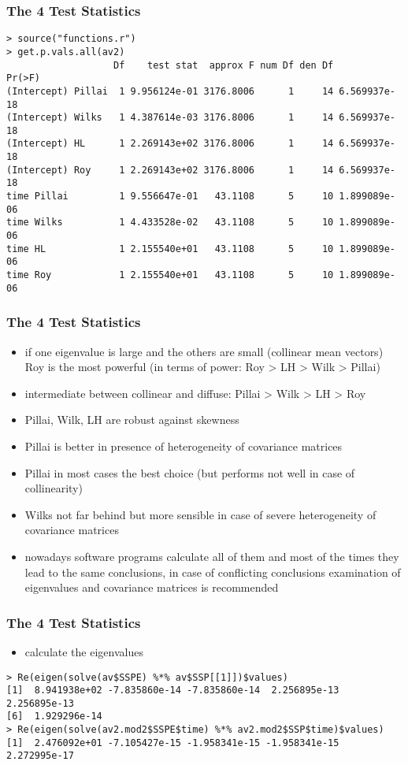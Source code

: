 \begin{frame}[fragile]\frametitle{The 4 Test Statistics}\scriptsize
\begin{verbatim}
> source("functions.r")
> get.p.vals.all(av2)
                   Df    test stat  approx F num Df den Df       Pr(>F)
(Intercept) Pillai  1 9.956124e-01 3176.8006      1     14 6.569937e-18
(Intercept) Wilks   1 4.387614e-03 3176.8006      1     14 6.569937e-18
(Intercept) HL      1 2.269143e+02 3176.8006      1     14 6.569937e-18
(Intercept) Roy     1 2.269143e+02 3176.8006      1     14 6.569937e-18
time Pillai         1 9.556647e-01   43.1108      5     10 1.899089e-06
time Wilks          1 4.433528e-02   43.1108      5     10 1.899089e-06
time HL             1 2.155540e+01   43.1108      5     10 1.899089e-06
time Roy            1 2.155540e+01   43.1108      5     10 1.899089e-06
\end{verbatim}
\end{frame}


\begin{frame}\frametitle{The 4 Test Statistics}
    \begin{itemize}
    \item if one eigenvalue is large and the others are small (collinear mean vectors) Roy is the most powerful (in terms of power: Roy > LH > Wilk > Pillai)
    \item intermediate between collinear and diffuse: Pillai > Wilk > LH > Roy
    \item Pillai, Wilk, LH are robust against skewness
    \item Pillai is better in presence of heterogeneity of covariance matrices
    \item Pillai in most cases the best choice (but performs not well in case of collinearity)
    \item Wilks not far behind but more sensible in case of severe heterogeneity of covariance matrices
    \item nowadays software programs calculate all of them and most of the times they lead to the same conclusions, in case of conflicting conclusions examination of eigenvalues and covariance matrices is recommended
    \end{itemize}
\end{frame}

\begin{frame}[fragile]\frametitle{The 4 Test Statistics}
  \begin{itemize}
  \item calculate the eigenvalues
  \end{itemize}\scriptsize
\begin{verbatim}
> Re(eigen(solve(av$SSPE) %*% av$SSP[[1]])$values)
[1]  8.941938e+02 -7.835860e-14 -7.835860e-14  2.256895e-13  2.256895e-13
[6]  1.929296e-14
> Re(eigen(solve(av2.mod2$SSPE$time) %*% av2.mod2$SSP$time)$values)
[1]  2.476092e+01 -7.105427e-15 -1.958341e-15 -1.958341e-15  2.272995e-17
\end{verbatim}
\end{frame}


